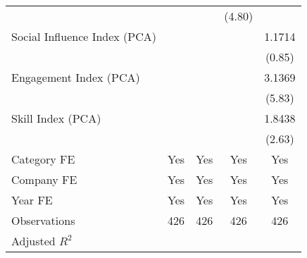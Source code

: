 {\begin{tabular}{l*{4}{c}}
                                   &                     &                     &      (4.80)         &                     \\
[1em]
Social Influence Index (PCA)       &                     &                     &                     &      1.1714         \\
                                   &                     &                     &                     &      (0.85)         \\
[1em]
Engagement Index (PCA)             &                     &                     &                     &      3.1369\sym{***}\\
                                   &                     &                     &                     &      (5.83)         \\
[1em]
Skill Index (PCA)                  &                     &                     &                     &      1.8438\sym{***}\\
                                   &                     &                     &                     &      (2.63)         \\
[1em]
Category FE                        &         Yes         &         Yes         &         Yes         &         Yes         \\
[1em]
Company FE                         &         Yes         &         Yes         &         Yes         &         Yes         \\
[1em]
Year FE                            &         Yes         &         Yes         &         Yes         &         Yes         \\
\hline
Observations                       &         426         &         426         &         426         &         426         \\
Adjusted \(R^{2}\)                 &                     &                     &                     &                     \\
\hline\hline
\end{tabular}
}

